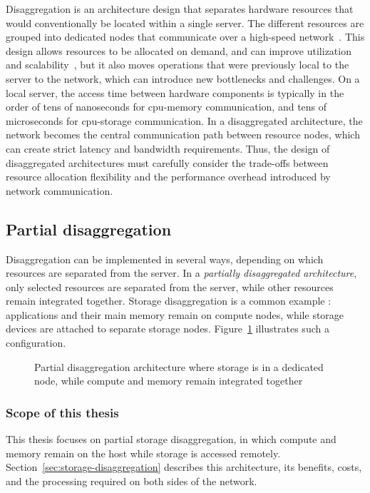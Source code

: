 Disaggregation is an architecture design that separates hardware resources that would conventionally be located within a single server. The different resources are grouped into dedicated nodes that communicate over a high-speed network~\cite{gao_network_2016}. This design allows resources to be allocated on demand, and can improve utilization and scalability~\cite{lin_disaggregated_2020}, but it also moves operations that were previously local to the server to the network, which can introduce new bottlenecks and challenges. On a local server, the access time between hardware components is typically in the order of tens of nanoseconds for \acrshort{cpu}-memory communication, and tens of microseconds for \acrshort{cpu}-storage communication. In a disaggregated architecture, the network becomes the central communication path between resource nodes, which can create strict latency and bandwidth requirements. Thus, the design of disaggregated architectures must carefully consider the trade-offs between resource allocation flexibility and the performance overhead introduced by network communication.

\subsection{Partial disaggregation}


Disaggregation can be implemented in several ways, depending on which resources are separated from the server. In a \textit{partially disaggregated architecture}, only selected resources are separated from the server, while other resources remain integrated together.
Storage disaggregation is a common example : applications and their main memory remain on compute nodes, while storage devices are attached to separate storage nodes. Figure~\ref{fig:storage-disaggregation} illustrates such a configuration.

\begin{figure}[htbp]
	\centering
	\caption{Partial disaggregation architecture where storage is in a dedicated node, while compute and memory remain integrated together}
	\label{fig:storage-disaggregation}
\end{figure}

\subsubsection{Scope of this thesis}
This thesis focuses on partial storage disaggregation, in which compute and memory remain on the host while storage is accessed remotely. Section~\ref{sec:storage-disaggregation} describes this architecture, its benefits, costs, and the processing required on both sides of the network.

